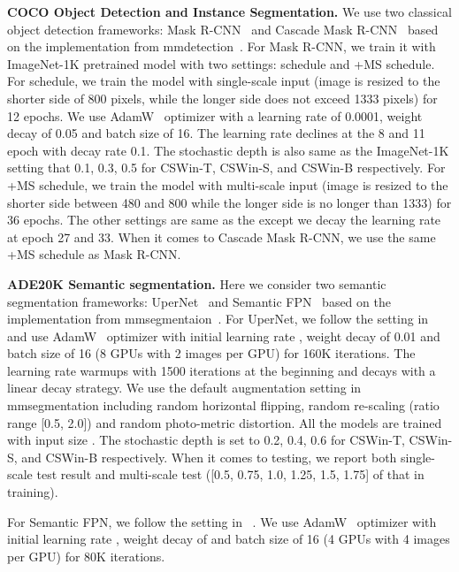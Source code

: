 \documentclass[10pt,twocolumn,letterpaper]{article}
\begin{document}
\noindent \textbf{COCO Object Detection and Instance Segmentation.}
We use two classical object detection frameworks: Mask R-CNN~\cite{he2017mask} and Cascade Mask R-CNN~\cite{cai2018cascade} based on the implementation from mmdetection~\cite{mmdetection}. For Mask R-CNN, we train it with ImageNet-1K pretrained model with two settings:  schedule and +MS schedule. For  schedule, we train the model with single-scale input (image is resized to the shorter side of 800 pixels, while the longer side does not exceed 1333 pixels) for 12 epochs. We use AdamW~\cite{loshchilov2019adamw} optimizer with a learning rate of 0.0001, weight decay of 0.05 and batch size of 16. The learning rate declines at the 8 and 11 epoch with decay rate 0.1. The stochastic depth is also same as the ImageNet-1K setting that 0.1, 0.3, 0.5 for CSWin-T, CSWin-S, and CSWin-B respectively.
For +MS schedule, we train the model with multi-scale input (image is resized to the shorter side between 480 and 800 while the longer side is no longer than 1333) for 36 epochs. The other settings are same as the  except we decay the learning rate at epoch 27 and 33.
When it comes to Cascade Mask R-CNN, we use the same +MS schedule as Mask R-CNN.

\noindent \textbf{ADE20K Semantic segmentation.}
Here we consider two semantic segmentation frameworks: UperNet~\cite{xiao2018upernet} and Semantic FPN~\cite{kirillov2019panoptic} based on the implementation from mmsegmentaion~\cite{mmseg2020}. 
For UperNet, we follow the setting in ~\cite{liu2021swin} and use AdamW~\cite{loshchilov2019adamw} optimizer with initial learning rate , weight decay of 0.01 and batch size of 16 (8 GPUs with 2 images per GPU) for 160K iterations. The learning rate warmups with 1500 iterations at the beginning and decays with a linear decay strategy. 
We use the default augmentation setting in mmsegmentation including random horizontal flipping, random re-scaling (ratio range [0.5, 2.0]) and random photo-metric distortion. All the models are trained with input size . The stochastic depth is set to 0.2, 0.4, 0.6 for CSWin-T, CSWin-S, and CSWin-B respectively.
When it comes to testing, we report both single-scale test result and multi-scale test ([0.5, 0.75, 1.0, 1.25, 1.5, 1.75] of that in training).

For Semantic FPN, we follow the setting in ~\cite{wang2021pyramid}. We use AdamW~\cite{loshchilov2019adamw} optimizer with initial learning rate , weight decay of  and batch size of 16 (4 GPUs with 4 images per GPU) for 80K iterations.
\end{document}
